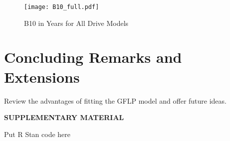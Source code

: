 \documentclass[12pt]{article}
\begin{document}
\begin{figure}[H]
    \centering
   \texttt{[image: B10\_full.pdf]}
		\caption{B10 in Years for All Drive Models \label{fig:first}} 
\end{figure}

\section{Concluding Remarks and Extensions}
Review the advantages of fitting the GFLP model and offer future ideas.  




    


\bigskip
\begin{center}
{\large\bf SUPPLEMENTARY MATERIAL}
\end{center}

\begin{description}

\item Put R Stan code here

\end{description}



\end{document}
